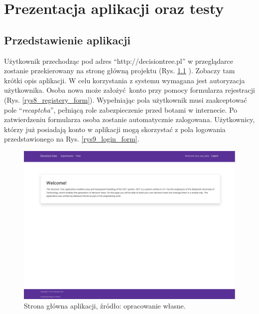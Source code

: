 \chapter{Prezentacja aplikacji oraz testy}
\section{Przedstawienie aplikacji}
Użytkownik przechodząc pod adres \enquote{http://decisiontree.pl} w przeglądarce zostanie przekierowany na stronę główną projektu (Rys. \ref{rys7_home_page} ). Zobaczy tam krótki opis aplikacji. W celu korzystania z systemu wymagana jest autoryzacja użytkownika. Osoba nowa może założyć konto przy pomocy formularza rejestracji (Rys. \ref{rys8_registery_form}). Wypełniając pola użytkownik musi zaakceptować pole \enquote{\textit{recaptcha}}, pełniącą role zabezpieczenie przed botami w internecie. Po zatwierdzeniu formularza osoba zostanie automatycznie zalogowana. Użytkownicy, którzy już posiadają konto w aplikacji mogą skorzystać z pola logowania przedstawionego na Rys. \ref{rys9_login_form}.

\begin{figure}[htb]
	\centering
	\includegraphics[width=15cm]{grafika/home_page.eps}
	\caption{Strona główna aplikacji, źródło: opracowanie własne.}
	\label{rys7_home_page}
\end{figure}

